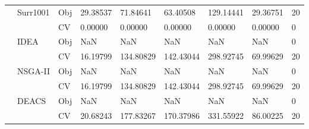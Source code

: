 \begin{table*}[!htb]
\begin{tabular}{lllllllll}
		& \multirow{2}{*}{Surr1001}          & Obj                                & 29.38537                           & 71.84641                           & 63.40508                             & 129.14441                           & 29.36751                          & 20               \\
		&                                    & CV                                 & 0.00000                            & 0.00000                            & 0.00000                              & 0.00000                             & 0.00000                           & 0                \\
		& \multirow{2}{*}{IDEA}              & Obj                                & NaN                                & NaN                                & NaN                                  & NaN                                 & NaN                               & 0                \\
		&                                    & CV                                 & 16.19799                           & 134.80829                          & 142.43044                            & 298.92745                           & 69.99629                          & 20               \\
		& \multirow{2}{*}{NSGA-II}           & Obj                                & NaN                                & NaN                                & NaN                                  & NaN                                 & NaN                               & 0                \\
		&                                    & CV                                 & 16.19799                           & 134.80829                          & 142.43044                            & 298.92745                           & 69.99629                          & 20               \\
		& \multirow{2}{*}{DEACS}             & Obj                                & NaN                                & NaN                                & NaN                                  & NaN                                 & NaN                               & 0                \\
		&                                    & CV                                 & 20.68243                           & 177.83267                          & 170.37986                            & 331.55922                           & 86.00225                          & 20               \\

\end{tabular}
\end{table*}
